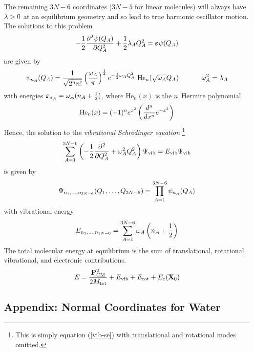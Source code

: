 \documentclass[11pt]{article}
\begin{document}
The remaining $3N-6$ coordinates ($3N-5$ for linear molecules) will always have $\lambda>0$ at an equilibrium geometry and so lead to true harmonic oscillator motion.
The solutions to this problem
\begin{align}
-\dfrac{1}{2}
	 \dfrac{ \partial^{2} \psi(Q_A) }{\partial Q_A ^{2}}
+\dfrac{1}{2}
	\lambda_A
	Q_A^2
=
	\bm\varepsilon
	\psi(Q_A)
\end{align}
are given by
\begin{align}
%
	\y_{n_A}(Q_A)
=
\fr{1}{\sqrt{2^n n!}}\pr{\fr{\w_A}{\pi}}^{\frac{1}{4}}
	e^{-\frac{1}{2}\w_AQ_A^2}
	\ \text{He}_n(\sqrt{\w_A}Q_A)
\sp
	\w_A^2=\la_A
\end{align}
with energies $\bm\varepsilon_{n_A}=\omega_A(n_A+\frac{1}{2})$, where $\text{He}_n(x)$ is the $n$\eth\ Hermite polynomial.
\begin{align}
%
	\text{He}_n(x)
=
	(-1)^n
	e^{x^2}
	\pr{\fr{d^n}{dx^n}e^{-x^2}}
\end{align}
Hence, the solution to the {\it vibrational Schr\"odinger equation} \footnote{This is simply equation (\ref{vib-se}) with translational and rotational modes omitted.}
\begin{align}
\sum_{A=1}^{3N-6}
	\left(-\dfrac{1}{2} \dfrac{ \partial^{2}  }{\partial Q_A ^{2}}+\omega_A^2Q_A^2\right)
	\Psi_\text{vib}
=
	E_\text{vib}
	\Psi_\text{vib}
\end{align}
is given by
\begin{align}
%
	\Y_{n_1,\ld,n_{3N-6}}(Q_1,\ld,Q_{3N-6})
=
\prod_{A=1}^{3N-6}
	\y_{n_A}(Q_A)
\end{align}
with vibrational energy
\begin{align}
%
	E_{n_1,\ld,n_{3N-6}}
=
\sum_{A=1}^{3N-6}
	\w_A
	\pr{n_A+\fr{1}{2}}
\end{align}
The total molecular energy at equilibrium is the sum of translational, rotational, vibrational, and electronic contributions.
\begin{align}
	E
=
	\dfrac{\mathbf{P}_\text{CM}^2}{2M_\text{tot}}
+
	E_\text{vib}
+
	E_\text{rot}
+
	E_e(\mathbf{X}_0)
\end{align}



\newpage
\subsection{Appendix: Normal Coordinates for Water}
\end{document}
